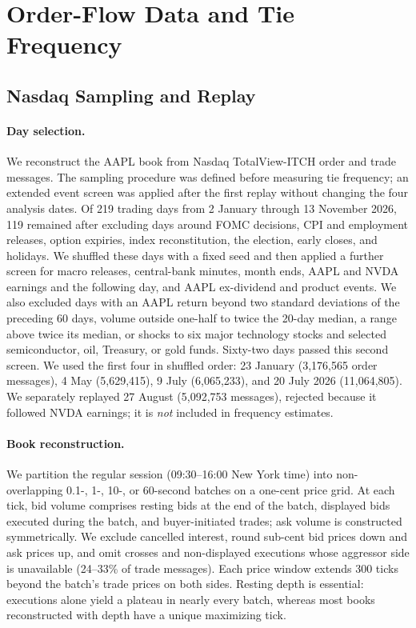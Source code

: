 

\section{Order-Flow Data and Tie Frequency}
\label{app:zq-data}

\subsection{Nasdaq Sampling and Replay}
\label{app:zq-data-replay}

\paragraph{Day selection.}
We reconstruct the AAPL book from Nasdaq TotalView-ITCH order and trade messages. The sampling procedure was defined before measuring tie frequency; an extended event screen was applied after the first replay without changing the four analysis dates. Of 219 trading days from 2 January through 13 November 2026, 119 remained after excluding days around FOMC decisions, CPI and employment releases, option expiries, index reconstitution, the election, early closes, and holidays. We shuffled these days with a fixed seed and then applied a further screen for macro releases, central-bank minutes, month ends, AAPL and NVDA earnings and the following day, and AAPL ex-dividend and product events. We also excluded days with an AAPL return beyond two standard deviations of the preceding 60 days, volume outside one-half to twice the 20-day median, a range above twice its median, or shocks to six major technology stocks and selected semiconductor, oil, Treasury, or gold funds. Sixty-two days passed this second screen. We used the first four in shuffled order: 23 January (3,176,565 order messages), 4 May (5,629,415), 9 July (6,065,233), and 20 July 2026 (11,064,805). We separately replayed 27 August (5,092,753 messages), rejected because it followed NVDA earnings; it is \emph{not} included in frequency estimates.

\paragraph{Book reconstruction.}
We partition the regular session (09:30--16:00 New York time) into non-overlapping 0.1-, 1-, 10-, or 60-second batches on a one-cent price grid. At each tick, bid volume comprises resting bids at the end of the batch, displayed bids executed during the batch, and buyer-initiated trades; ask volume is constructed symmetrically. We exclude cancelled interest, round sub-cent bid prices down and ask prices up, and omit crosses and non-displayed executions whose aggressor side is unavailable (24--33\% of trade messages). Each price window extends 300 ticks beyond the batch's trade prices on both sides. Resting depth is essential: executions alone yield a plateau in nearly every batch, whereas most books reconstructed with depth have a unique maximizing tick.


